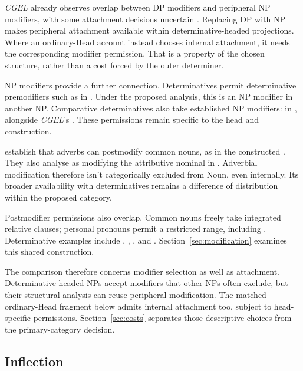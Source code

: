 \documentclass[12pt]{article}
\begin{document}
\textit{CGEL} already observes overlap between DP modifiers and peripheral NP modifiers, with some attachment decisions uncertain \citep[431]{huddleston2002}. Replacing DP with NP makes peripheral attachment available within determinative-headed projections. Where an ordinary-Head account instead chooses internal attachment, it needs the corresponding modifier permission. That is a property of the chosen structure, rather than a cost forced by the outer determiner.

NP modifiers provide a further connection. Determinatives permit determinative premodifiers such as  in  \citep[393]{huddleston2002}. Under the proposed analysis, this is an NP modifier in another NP. Comparative determinatives also take established NP modifiers:  in , alongside \textit{CGEL}'s  \citep[432]{huddleston2002}. These permissions remain specific to the head and construction.

\textcite[42--47]{payne2010} establish that adverbs can postmodify common nouns, as in the constructed . They also analyse  as modifying the attributive nominal  in  \citep[p.~75, n.~3]{payne2010}. Adverbial modification therefore isn't categorically excluded from Noun, even internally. Its broader availability with determinatives remains a difference of distribution within the proposed category.

Postmodifier permissions also overlap. Common nouns freely take integrated relative clauses; personal pronouns permit a restricted range, including  \citep[430]{huddleston2002}. Determinative examples include , , , and . Section~\ref{sec:modification} examines this shared construction.

The comparison therefore concerns modifier selection as well as attachment. Determinative-headed NPs accept modifiers that other NPs often exclude, but their structural analysis can reuse peripheral modification. The matched ordinary-Head fragment below admits internal attachment too, subject to head-specific permissions. Section~\ref{sec:costs} separates those descriptive choices from the primary-category decision.

\subsection{Inflection}\label{sec:inflection}
\end{document}
